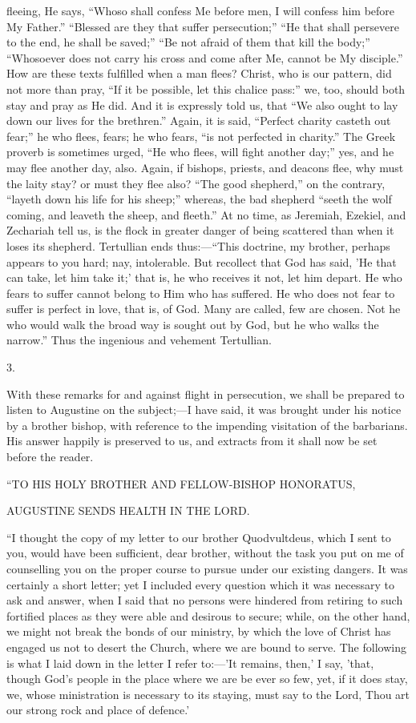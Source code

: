 fleeing, He says, ``Whoso shall confess Me before men, I will
confess him before My Father.'' ``Blessed are they that suffer
persecution;'' ``He that shall persevere to the end, he shall
be saved;'' ``Be not afraid of them that kill the body;''
``Whosoever does not carry his cross and come after Me, cannot be
My disciple.'' How are these texts fulfilled when a man flees?
Christ, who is our pattern, did not more than pray, ``If it be
possible, let this chalice pass:'' we, too, should both stay and
pray as He did. And it is expressly told us, that ``We also ought
to lay down our lives for the brethren.'' Again, it is said,
``Perfect charity casteth out fear;'' he who flees, fears; he
who fears, ``is not perfected in charity.'' The Greek proverb
is sometimes urged, ``He who flees, will fight another day;''
yes, and he may flee another day, also. Again, if bishops, priests,
and deacons flee, why must the laity stay? or must they flee also?
``The good shepherd,'' on the contrary, ``layeth down
his life for his sheep;'' whereas, the bad shepherd ``seeth
the wolf coming, and leaveth the sheep, and fleeth.'' At no time,
as Jeremiah, Ezekiel, and Zechariah tell us, is the flock in greater
danger of being scattered than when it loses its shepherd. Tertullian
ends thus:—``This doctrine, my brother, perhaps appears to you
hard; nay, intolerable. But recollect that God has said, 'He that can
take, let him take it;' that is, he who receives it not, let him
depart. He who fears to suffer cannot belong to Him who has suffered.
He who does not fear to suffer is perfect in love, that is, of God.
Many are called, few are chosen. Not he who would walk the broad way
is sought out by God, but he who walks the narrow.'' Thus the
ingenious and vehement Tertullian.

3.

With these remarks for and against flight in persecution, we shall
be prepared to listen to Augustine on the subject;—I have said, it
was brought under his notice by a brother bishop, with reference to
the impending visitation of the barbarians. His answer happily is
preserved to us, and extracts from it shall now be set before the
reader.

``TO HIS HOLY BROTHER AND FELLOW-BISHOP
HONORATUS,

AUGUSTINE SENDS HEALTH IN THE LORD.

``I thought the copy of my letter to our brother Quodvultdeus,
which I sent to you, would have been sufficient, dear brother, without
the task you put on me of counselling you on the proper course to
pursue under our existing dangers. It was certainly a short letter;
yet I included every question which it was necessary to ask and
answer, when I said that no persons were hindered from retiring to
such fortified places as they were able and desirous to secure; while,
on the other hand, we might not break the bonds of our ministry,
by which the love of Christ has engaged us not to desert the Church,
where we are bound to serve. The following is what I laid down in the
letter I refer to:—'It remains, then,' I say, 'that, though God's
people in the place where we are be ever so few, yet, if it does stay,
we, whose ministration is necessary to its staying, must say to the
Lord, Thou art our strong rock and place of defence.'

